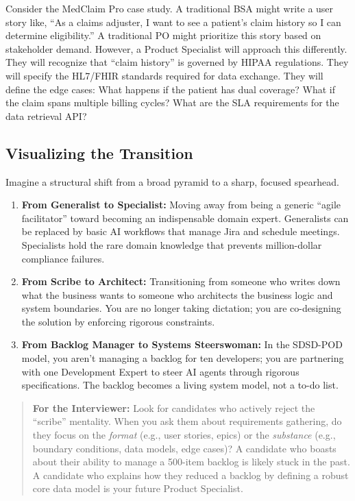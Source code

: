 Consider the MedClaim Pro case study. A traditional BSA might write a
user story like, ``As a claims adjuster, I want to see a patient's claim
history so I can determine eligibility.'' A traditional PO might
prioritize this story based on stakeholder demand. However, a Product
Specialist will approach this differently. They will recognize that
``claim history'' is governed by HIPAA regulations. They will specify
the HL7/FHIR standards required for data exchange. They will define the
edge cases: What happens if the patient has dual coverage? What if the
claim spans multiple billing cycles? What are the SLA requirements for
the data retrieval API?

\subsection{Visualizing the
Transition}\label{visualizing-the-transition}

Imagine a structural shift from a broad pyramid to a sharp, focused
spearhead.

\begin{enumerate}
\def\labelenumi{\arabic{enumi}.}
\tightlist
\item
  \textbf{From Generalist to Specialist:} Moving away from being a
  generic ``agile facilitator'' toward becoming an indispensable domain
  expert. Generalists can be replaced by basic AI workflows that manage
  Jira and schedule meetings. Specialists hold the rare domain knowledge
  that prevents million-dollar compliance failures.
\item
  \textbf{From Scribe to Architect:} Transitioning from someone who
  writes down what the business wants to someone who architects the
  business logic and system boundaries. You are no longer taking
  dictation; you are co-designing the solution by enforcing rigorous
  constraints.
\item
  \textbf{From Backlog Manager to Systems Steerswoman:} In the SDSD-POD
  model, you aren't managing a backlog for ten developers; you are
  partnering with one Development Expert to steer AI agents through
  rigorous specifications. The backlog becomes a living system model,
  not a to-do list.
\end{enumerate}

\begin{quote}
\textbf{For the Interviewer:} Look for candidates who actively reject
the ``scribe'' mentality. When you ask them about requirements
gathering, do they focus on the \emph{format} (e.g., user stories,
epics) or the \emph{substance} (e.g., boundary conditions, data models,
edge cases)? A candidate who boasts about their ability to manage a
500-item backlog is likely stuck in the past. A candidate who explains
how they reduced a backlog by defining a robust core data model is your
future Product Specialist.
\end{quote}

